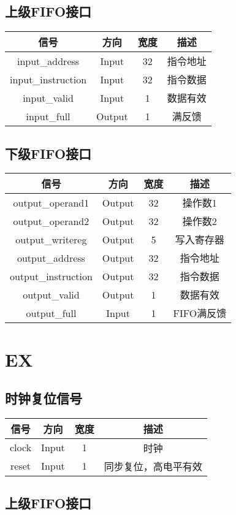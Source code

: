 \documentclass{article}
\newenvironment{signals}{
	\begin{center}
		\begin{tabular}{| c | c | c | c |}
			\hline
			信号 & 方向 & 宽度 & 描述 \\ \hline
}{
		\end{tabular}
	\end{center}
}
\newcommand\sigin{Input}
\newcommand\sigout{Output}
\begin{document}
\subsection{上级FIFO接口}

\begin{signals}
	input\_address & \sigin & 32 & 指令地址 \\ \hline
	input\_instruction & \sigin & 32 & 指令数据 \\ \hline
	input\_valid & \sigin & 1 & 数据有效 \\ \hline
	input\_full & \sigout & 1 & 满反馈 \\ \hline
\end{signals}

\subsection{下级FIFO接口}

\begin{signals}
	output\_operand1 & \sigout & 32 & 操作数1 \\ \hline
	output\_operand2 & \sigout & 32 & 操作数2 \\ \hline
	output\_writereg & \sigout & 5 & 写入寄存器 \\ \hline
	output\_address & \sigout & 32 & 指令地址 \\ \hline
	output\_instruction & \sigout & 32 & 指令数据 \\ \hline
	output\_valid & \sigout & 1 & 数据有效 \\ \hline
	output\_full & \sigin & 1 & FIFO满反馈 \\ \hline
\end{signals}

\section{EX}

\subsection{时钟复位信号}

\begin{signals}
	clock & \sigin & 1 & 时钟 \\ \hline
	reset & \sigin & 1 & 同步复位，高电平有效 \\ \hline
\end{signals}

\subsection{上级FIFO接口}
\end{document}
